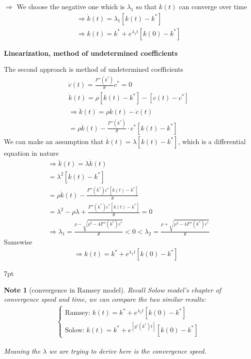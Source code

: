 \documentclass{article}
\newenvironment{blueblock}{
\def\FrameCommand{
  \hspace{1pt}
    {\color{DarkBlue}
    \vrule width 2pt}
    {\color{blueshade}
    \vrule width 4pt}
  \colorbox{blueshade}
}
\MakeFramed{
  \advance
  \hsize-
  \width
  \FrameRestore}
\noindent\hspace{-4.55pt}%
\begin{adjustwidth}{}{7pt}
\vspace{2pt}\vspace{2pt}
}
{\vspace{2pt}\end{adjustwidth}\endMakeFramed}
\newtheorem{note}{Note}
\begin{document}
$\Rightarrow$ We choose the negative one which is $\lambda_{1}$  so that $k(t)$ can converge over time
\begin{align}
&\Rightarrow \dot k(t)=\lambda_{1}[k(t)-k^{*}]
\\&\Rightarrow k(t)=k^{*}+e^{\lambda_{1} t }[k(0)-k^{*}]
\end{align}

\textbf{Linearization, method of undetermined coefficients}

The second approach is method of undetermined coefficients
\begin{align}
&\dot c(t)=\frac{F''(k^{*})}{\theta}c^{*}=0
\\& \dot k(t)=\rho [k(t)-k^{*}]-[c(t)-c^{*}]
\\&\Rightarrow \ddot k(t)=\rho \dot k(t)-\dot c(t)
\\&=\rho \dot k (t)-\frac{F''(k^{*})}{\theta}\cdot c^{*}[k(t)-k^{*}]
\end{align}
We can make an assumption that $\dot k(t)=\lambda [k(t)-k^{*}]$, which is a differential equation in nature
\begin{align}
&\Rightarrow \ddot k(t)=\lambda \dot k(t)
\\&=\lambda ^{2}[k(t)-k^{*}]
\\&=\rho \dot k(t)-\frac{F''(k^{*})c^{*}[k(t)-k^{*}]}{\theta}
\\&=\lambda^{2}-\rho \lambda +\frac{F''(k^{*})c^{*}[k(t)-k^{*}]}{\theta}=0
\\&\Rightarrow \lambda_{1}=\frac{\rho-\sqrt{\rho^{2}-4F''(k^{*})c^{*}}}{\theta}<0<\lambda_{2}=\frac{\rho+\sqrt{\rho^{2}-4F''(k^{*})c^{*}}}{\theta}
\end{align}
Samewise
\begin{align}
\Rightarrow k(t)=k^{*}+e^{\lambda_{1} t }[k(0)-k^{*}]
\end{align}

\begin{blueblock}
\begin{note}[convergence in Ramsey model]
Recall Solow model's chapter of convergence speed and time, we can compare the two similar results:
\begin{align}
&
\begin{cases}
\text{Ramsey: }k(t)=k^{*}+e^{\lambda_{1} t }[k(0)-k^{*}]
\\\text{Solow: }k(t)=k^{*}+e^{[g'(k^{*})t]}[k(0)-k^{*}] 
\end{cases}
\end{align}

Meaning the $\lambda$ we are trying to derive here is the convergence speed.
\end{note}
\end{blueblock}
\end{document}
